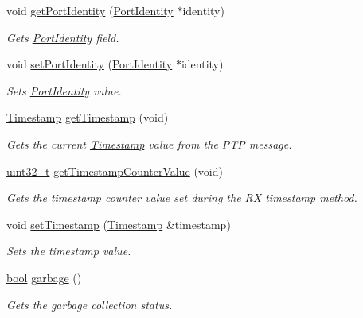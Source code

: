 \begin{DoxyCompactItemize}
void \hyperlink{class_p_t_p_message_common_a81caf27b0bcf771cb3c35d8fe42ae8ed}{get\+Port\+Identity} (\hyperlink{class_port_identity}{Port\+Identity} $\ast$identity)
\begin{DoxyCompactList}\small\item\em Gets \hyperlink{class_port_identity}{Port\+Identity} field. \end{DoxyCompactList}\item 
void \hyperlink{class_p_t_p_message_common_a94378ebb164e2095d3a17b393a63f2dc}{set\+Port\+Identity} (\hyperlink{class_port_identity}{Port\+Identity} $\ast$identity)
\begin{DoxyCompactList}\small\item\em Sets \hyperlink{class_port_identity}{Port\+Identity} value. \end{DoxyCompactList}\item 
\hyperlink{class_timestamp}{Timestamp} \hyperlink{class_p_t_p_message_common_a0bdaf174c565b4d10499011885dde906}{get\+Timestamp} (void)
\begin{DoxyCompactList}\small\item\em Gets the current \hyperlink{class_timestamp}{Timestamp} value from the P\+TP message. \end{DoxyCompactList}\item 
\hyperlink{parse_8c_a6eb1e68cc391dd753bc8ce896dbb8315}{uint32\+\_\+t} \hyperlink{class_p_t_p_message_common_a2f9298443285c8dd689acce23b59dc8f}{get\+Timestamp\+Counter\+Value} (void)
\begin{DoxyCompactList}\small\item\em Gets the timestamp counter value set during the RX timestamp method. \end{DoxyCompactList}\item 
void \hyperlink{class_p_t_p_message_common_aa35baf97ba1690eb11defa05a40f7d05}{set\+Timestamp} (\hyperlink{class_timestamp}{Timestamp} \&timestamp)
\begin{DoxyCompactList}\small\item\em Sets the timestamp value. \end{DoxyCompactList}\item 
\hyperlink{avb__gptp_8h_af6a258d8f3ee5206d682d799316314b1}{bool} \hyperlink{class_p_t_p_message_common_a1a2b4b1eeb289619b14affa39f8284f7}{garbage} ()
\begin{DoxyCompactList}\small\item\em Gets the garbage collection status. \end{DoxyCompactList}\item 

\end{DoxyCompactItemize}
